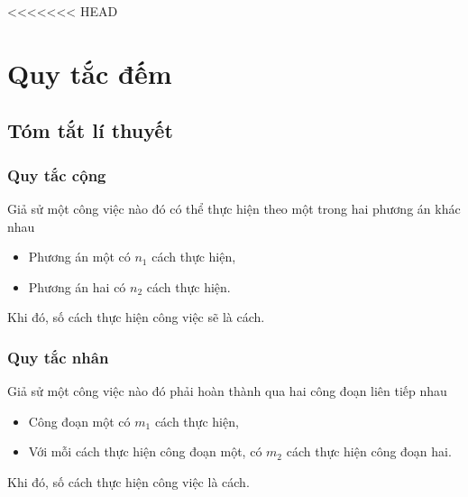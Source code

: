 <<<<<<< HEAD
\def\tenchude{QUY TẮC ĐẾM}
\setcounter{section}{0}
\setcounter{dang}{0}
\section{Quy tắc đếm}
\subsection{Tóm tắt lí thuyết}
\subsubsection{Quy tắc cộng}
Giả sử một công việc nào đó có thể thực hiện theo một trong hai phương án khác nhau
\begin{itemize}
	\item Phương án một có $n_1$ cách thực hiện,
	\item Phương án hai có $n_2$ cách thực hiện.
\end{itemize}
Khi đó, số cách thực hiện công việc sẽ là  cách.
\subsubsection{Quy tắc nhân}
Giả sử một công việc nào đó phải hoàn thành qua hai công đoạn liên tiếp nhau
\begin{itemize}
	\item Công đoạn một có $m_1$ cách thực hiện,
	\item Với mỗi cách thực hiện công đoạn một, có $m_2$ cách thực hiện công đoạn hai.
\end{itemize}
Khi đó, số cách thực hiện công việc là  cách.

